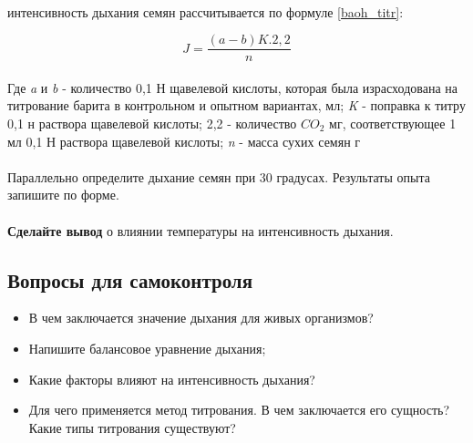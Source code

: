 \paragraph*{}интенсивность дыхания семян рассчитывается по формуле \ref{baoh_titr}:

\begin{equation}
	\label{baoh_titr}
	J = \frac{(a-b)K.2,2}{n}
\end{equation}

\paragraph*{}Где \textit{a} и \textit{b} - количество 0,1 Н щавелевой кислоты, которая была израсходована на титрование барита в контрольном и опытном вариантах, мл; \textit{K} - поправка к титру 0,1 н раствора щавелевой кислоты; 2,2 - количество $CO_2$ мг, соответствующее 1 мл 0,1 Н раствора щавелевой кислоты; \textit{n} - масса сухих семян г 

\paragraph*{}Параллельно определите дыхание семян при 30 градусах. Результаты опыта запишите по форме.

\paragraph*{}\textbf{Сделайте вывод} о влиянии температуры на интенсивность дыхания.

\subsection*{Вопросы для самоконтроля}

	\begin{itemize}
		\item В чем заключается значение дыхания для живых организмов?
		\item Напишите балансовое уравнение дыхания;
		\item Какие факторы влияют на интенсивность дыхания?
		\item Для чего применяется метод титрования. В чем заключается его сущность? Какие типы титрования существуют?
		
	\end{itemize}
